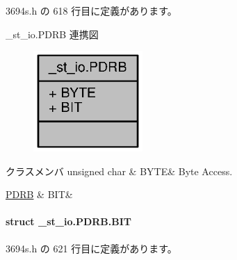  3694s.\+h の 618 行目に定義があります。



\+\_\+st\+\_\+io.\+P\+D\+R\+B 連携図
\nopagebreak
\begin{figure}[H]
\begin{center}
\leavevmode
\includegraphics[width=118pt]{dd/de4/union__st__io_8PDRB__coll__graph}
\end{center}
\end{figure}
\begin{DoxyFields}{クラスメンバ}
unsigned char\label{3694s_8h_ae409eb2ba6eb6801f52763ae370c350e}
&
B\+Y\+T\+E&
Byte Access. \\
\hline

\hyperlink{3694s_8h_dd/dcf/struct__st__io_8PDRB_8BIT}{P\+D\+R\+B}\label{3694s_8h_adb957fdc8000e1eef04a243f5199aa52}
&
B\+I\+T&
\\
\hline

\end{DoxyFields}
\label{struct__st__io_8PDRB_8BIT}
\paragraph{struct \+\_\+st\+\_\+io.\+P\+D\+R\+B.\+B\+I\+T}


 3694s.\+h の 621 行目に定義があります。



